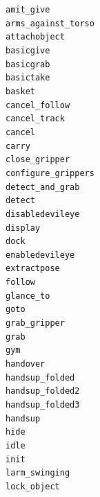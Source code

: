 \documentclass[compress]{beamer}
\begin{document}
{{


{
\begin{frame}{}
    \begin{multicols}{4}
\scriptsize

{\tt amit\_give} \\
{\tt arms\_against\_torso} \\
{\tt attachobject} \\
{\tt basicgive} \\
{\tt basicgrab} \\
{\tt basictake} \\
{\tt basket} \\
{\tt cancel\_follow} \\
{\tt cancel\_track} \\
{\tt cancel} \\
{\tt carry} \\
{\tt close\_gripper} \\
{\tt configure\_grippers} \\
{\tt detect\_and\_grab} \\
{\tt detect} \\
{\tt disabledevileye} \\
{\tt display} \\
{\tt dock} \\
{\tt enabledevileye} \\
{\tt extractpose} \\
{\tt follow} \\
{\tt glance\_to} \\
{\tt goto} \\
{\tt grab\_gripper} \\
{\tt grab} \\
{\tt gym} \\
{\tt handover} \\
{\tt handsup\_folded} \\
{\tt handsup\_folded2} \\
{\tt handsup\_folded3} \\
{\tt handsup} \\
{\tt hide} \\
{\tt idle} \\
{\tt init} \\
{\tt larm\_swinging} \\
{\tt lock\_object} \\

\end{multicols}
\end{frame}}}}
\end{document}
